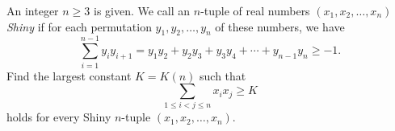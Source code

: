 An integer 
$n \geq 3$
 is given. We call an 
$n$-tuple of real numbers 
$(x_1, x_2, \dots, x_n)$ \textit{Shiny}
 if for each permutation 
$y_1, y_2, \dots, y_n$
 of these numbers, we have
$$\sum \limits_{i=1}^{n-1} y_i y_{i+1} = y_1y_2 + y_2y_3 + y_3y_4 + \cdots + y_{n-1}y_n \geq -1.$$
Find the largest constant 
$K = K(n)$
 such that
$$\sum \limits_{1 \leq i < j \leq n} x_i x_j \geq K$$
holds for every Shiny 
$n$-tuple 
$(x_1, x_2, \dots, x_n)$.
